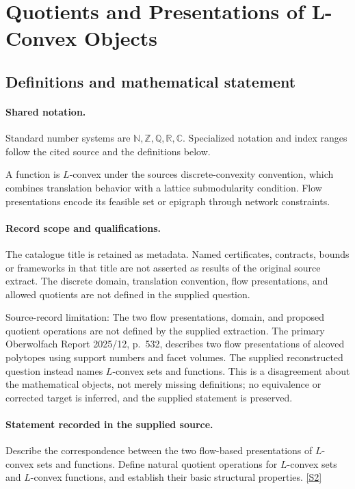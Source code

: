 \documentclass[11pt]{article}
\newcommand{\sref}[2]{\hyperlink{source:#1:#2}{[S#2]}}
\begin{document}
\section{Quotients and Presentations of L-Convex Objects}\label{statement}

\subsection{Definitions and mathematical statement}

\paragraph{Shared notation.}Standard number systems are $\mathbb N,\mathbb Z,\mathbb Q,\mathbb R,\mathbb C$. Specialized notation and index ranges follow the cited source and the definitions below.


A function is $L$-convex under the source\textquotesingle s discrete-convexity convention, which combines translation behavior with a lattice submodularity condition. Flow presentations encode its feasible set or epigraph through network constraints.
\paragraph{Record scope and qualifications.}
The catalogue title is retained as metadata. Named certificates, contracts, bounds or frameworks in that title are not asserted as results of the original source extract.
The discrete domain, translation convention, flow presentations, and allowed quotients are not defined in the supplied question.

Source-record limitation: The two flow presentations, domain, and proposed quotient operations are not defined by the supplied extraction. The primary Oberwolfach Report 2025/12, p.\ 532, describes two flow presentations of alcoved polytopes using support numbers and facet volumes. The supplied reconstructed question instead names $L$-convex sets and functions. This is a disagreement about the mathematical objects, not merely missing definitions; no equivalence or corrected target is inferred, and the supplied statement is preserved.
\paragraph{Statement recorded in the supplied source.}
Describe the correspondence between the two flow-based presentations of $L$-convex sets and functions. Define natural quotient operations for $L$-convex sets and $L$-convex functions, and establish their basic structural properties. \sref{statement}{2}
\end{document}
